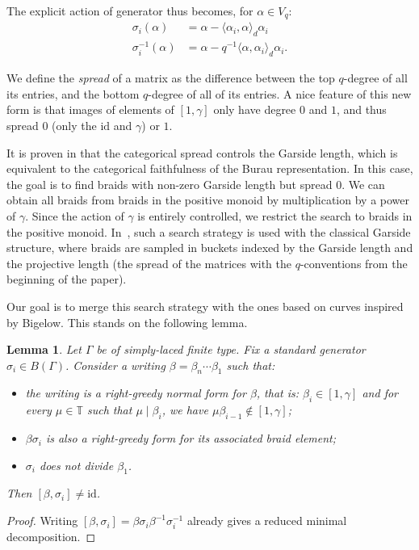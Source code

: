 \documentclass[a4paper]{amsart}
\newcommand{\0}{\mathbf{0}}
\newcommand{\id}{\mathrm{id}}
\theoremstyle{theorem}
\newtheorem{lemma}[theorem]{Lemma}
\begin{document}
The explicit action of generator thus becomes, for $\alpha \in V_q$:
\begin{align} \label{eq:dualaction}
  \sigma_i(\alpha)&=\alpha-\langle \alpha_i,\alpha\rangle_d\alpha_i \\
  \sigma_i^{-1}(\alpha)&=\alpha-q^{-1}\langle \alpha,\alpha_i\rangle_d\alpha_i. \nonumber
\end{align}

We define the \emph{spread} of a matrix as the difference between the top $q$-degree of all its entries, and the bottom $q$-degree of all of its entries. A nice feature of this new form is that images of elements of $[1,\gamma]$ only have degree $0$ and $1$, and thus spread $0$ (only the $\id$ and $\gamma$) or $1$.

It is proven in \cite{LQ} that the categorical spread controls the Garside length, which is equivalent to the categorical faithfulness of the Burau representation. In this case, the goal is to find braids with non-zero Garside length but spread $0$.
We can obtain all braids from braids in the positive monoid by multiplication by a power of $\gamma$.
Since the action of \(\gamma\) is entirely controlled, we restrict the search to braids in the positive monoid.
In~\cite{GibsonWilliamsonYacobi}, such a search strategy is used with the classical Garside structure, where braids are sampled in buckets indexed by the Garside length and the projective length (the spread of the matrices with the $q$-conventions from the beginning of the paper).

Our goal is to merge this search strategy with the ones based on curves inspired by Bigelow. This stands on the following lemma.

\begin{lemma} \label{lem:samecurve}
  Let \(\Gamma\) be of simply-laced finite type.
  Fix a standard generator $\sigma_i\in B(\Gamma)$.
  Consider a writing $\beta=\beta_n\cdots \beta_1$ such that:
  \begin{itemize}
  \item the writing is a right-greedy normal form for $\beta$, that is: $\beta_i\in [1,\gamma]$ and for every \(\mu \in \mathbb{T}\) such that $\mu \mid \beta_i$, we have $\mu\beta_{i-1}\notin [1,\gamma]$;
  \item $\beta\sigma_i$ is also a right-greedy form for its associated braid element;
  \item $\sigma_i$ does not divide $\beta_1$.
  \end{itemize}
Then $[\beta,\sigma_i]\neq \id$.
\end{lemma}
\begin{proof}
  Writing $[\beta,\sigma_i]=\beta\sigma_i\beta^{-1}\sigma_i^{-1}$ already gives a reduced minimal decomposition.
\end{proof}
\end{document}
